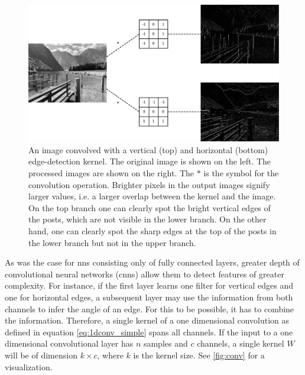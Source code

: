 \begin{figure}
	\centering
	\includegraphics[width=\textwidth]{chapters/foundations/sections/ml/images/edge_filter.pdf}
	\caption[Edge detection convolution]{An image convolved with a vertical (top) and horizontal (bottom) edge-detection kernel. The original image is shown on the left. The processed images are shown on the right. The $\ast$ is the symbol for the convolution operation. Brighter pixels in the output images signify larger values, i.e. a larger overlap between the kernel and the image. On the top branch one can clearly spot the bright vertical edges of the posts, which are not visible in the lower branch. On the other hand, one can clearly spot the sharp edges at the top of the posts in the lower branch but not in the upper branch.}\label{fig:edge-filter}
\end{figure}

As was the case for \acrshort{nn}s consisting only of fully connected layers, greater depth of convolutional neural networks (\acrshort{cnn}s) allow them to detect features of greater complexity. For instance, if the first layer learns one filter for vertical edges and one for horizontal edges, a subsequent layer may use the information from both channels to infer the angle of an edge. For this to be possible, it has to combine the information. Therefore, a single kernel of a one dimensional convolution as defined in equation \eqref{eq:1dconv_simple} spans all channels. If the input to a one dimensional convolutional layer has $n$ samples and $c$ channels, a single kernel $W$ will be of dimension $k\times c$, where $k$ is the kernel size. See \autoref{fig:conv} for a visualization.

